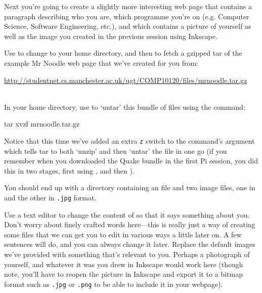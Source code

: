 Next you're going to create a slightly more interesting web page that contains a paragraph describing who you are, which programme you're on (e.g. Computer Science, Software Engineering, etc.), and which contains a picture of yourself as well as the image you created in the previous session using Inkscape.

Use  to change to your home directory, and then  to fetch a gzipped tar of the example Mr Noodle web page that we've created for you from:
\\

{\small

\url{http://studentnet.cs.manchester.ac.uk/ugt/COMP10120/files/mrnoodle.tar.gz}
}
\\

In your home directory, use  to `untar' this bundle of files using the command:

\begin{ttoutenv}
tar xvzf mrnoodle.tar.gz
\end{ttoutenv}

Notice that this time we've added an extra \texttt{z} switch to the  command's argument which tells tar to both `unzip' and then `untar' the file in one go (if you remember when you downloaded the Quake bundle in the first Pi session, you did this in two stages, first using , and then ).

You should end up with a  directory containing an  file and two image files, one in  and the other in \texttt{.jpg} format.

Use a text editor to change the content of  so that it says something about you. Don't worry about finely crafted words here---this is really just a way of creating some files that we can get you to edit in various ways a little later on. A few sentences will do, and you can always change it later. Replace the default images we've provided with something that's relevant to you. Perhaps a photograph of yourself, and whatever it was you drew in Inkscape would work here (though note, you'll have to reopen the picture in Inkscape and export it to a bitmap format such as \texttt{.jpg} or \texttt{.png} to be able to include it in your webpage).

